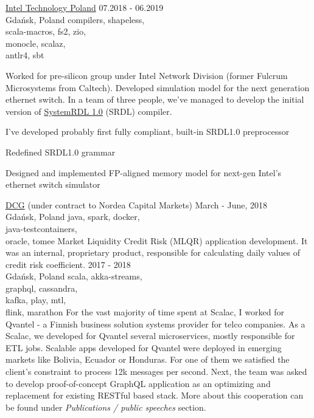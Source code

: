\documentclass[a4paper,11pt]{cv4tw}%
\begin{document}
      {\href{https://www.intel.com/content/www/us/en/jobs/locations/poland.html}{Intel Technology Poland}}
      {07.2018 - 06.2019\\Gdańsk, Poland}
      {compilers, shapeless,\\scala-macros, fs2, zio,\\monocle, scalaz,\\antlr4, sbt}
      {Worked for pre-silicon group under Intel Network Division (former Fulcrum Microsystems from Caltech).
        Developed simulation model for the next generation ethernet switch. In a team of three people, we've
        managed to develop the initial version of
        \href{https://www.accellera.org/downloads/standards/systemrdl}{SystemRDL 1.0} (SRDL) compiler.
        \begin{missions}
        \item I've developed probably first fully compliant, built-in SRDL1.0 preprocessor
        \item Redefined SRDL1.0 grammar
        \item Designed and implemented FP-aligned memory model for next-gen Intel's ethernet switch simulator
        \end{missions}
      }
      {\href{https://diversecg.pl/}{DCG} (under contract to Nordea Capital Markets)}
      {March - June, 2018\\Gdańsk, Poland}
      {java, spark, docker,\\java-testcontainers,\\oracle, tomee}
      {Market Liquidity Credit Risk (MLQR) application development. It was an internal,
        proprietary product, responsible for calculating daily values of credit risk
        coefficient.
      }
      {2017 - 2018\\Gdańsk, Poland}
      {scala, akka-streams,\\graphql, cassandra,\\kafka, play, mtl,\\flink, marathon}
      {For the vast majority of time spent at Scalac, I worked for Qvantel - a Finnish business solution
        systems provider for telco companies. As a Scalac, we developed for Qvantel several microservices,
        mostly responsible for ETL jobs. Scalable apps developed for Qvantel were deployed in emerging markets
        like Bolivia, Ecuador or Honduras. For one of them we satisfied the client's constraint
        to process \approx12k messages per second. Next, the team was asked to develop proof-of-concept
        GraphQL application as an optimizing and replacement for existing RESTful based stack. More about this
        cooperation can be found under \emph{Publications / public speeches} section.
      }
\end{document}
